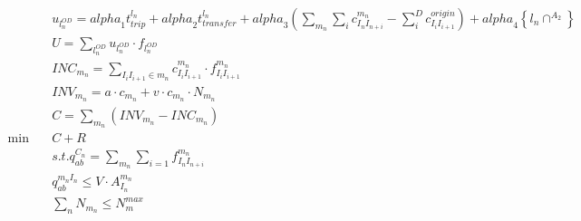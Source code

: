 \begin{align}
  & u_{l_{n}^{O D}} = \mathit{alpha}_{1} t_{t r i p}^{l_{n}} + \mathit{alpha}_{2} t_{t r a n s f e r}^{l_{n}} + \mathit{alpha}_{3} \left(\sum_{m_{n}} \sum_{i} c_{I_{n} I_{n + i}}^{m_{n}} - \sum_{i}^{D} c_{I_{i} I_{i + 1}}^{o r i g i n}\right) + \mathit{alpha}_{4} \left\{l_{n} \cap^{A_{2}}\right\} \tag{eq\_0023} \\
  & U = \sum_{l_{n}^{O D}} u_{l_{n}^{O D}} \cdot f_{l_{n}^{O D}} \tag{eq\_0024} \\
  & \mathit{INC}_{m_{n}} = \sum_{I_{i} I_{i + 1} \in m_{n}} c_{I_{i} I_{i + 1}}^{m_{n}} \cdot f_{I_{i} I_{i + 1}}^{m_{n}} \tag{eq\_0025} \\
  & \mathit{INV}_{m_{n}} = a \cdot c_{m_{n}} + v \cdot c_{m_{n}} \cdot N_{m_{n}} \tag{eq\_0026} \\
  & C = \sum_{m_{n}} \left(\mathit{INV}_{m_{n}} - \mathit{INC}_{m_{n}}\right) \tag{eq\_0027} \\
  \min\quad & C + R \tag{eq\_0030} \\
  & s . t . q_{a b}^{C_{n}} = \sum_{m_{n}} \sum_{i = 1} f_{I_{n} I_{n + i}}^{m_{n}} \tag{eq\_0031} \\
  & q_{a b}^{m_{n} I_{n}} \leq V \cdot A_{I_{n}}^{m_{n}} \tag{eq\_0032} \\
  & \sum_{n} N_{m_{n}} \leq N_{m}^{m a x} \tag{eq\_0033} \\
\end{align}
